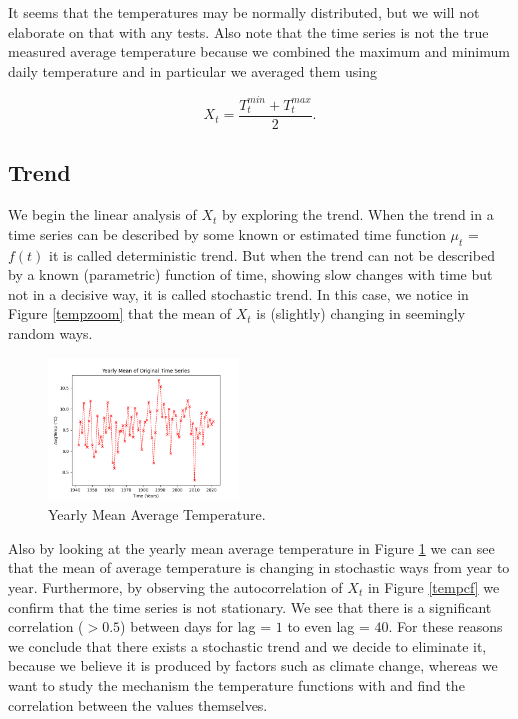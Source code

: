 \documentclass[conference]{IEEEtran}
\begin{document}
It seems that the temperatures may be normally distributed, but we will not elaborate on that with any tests. Also note that the time series is not the true measured average temperature because we combined the maximum and minimum daily temperature and in particular we averaged them using

\begin{equation}\label{avgeq}
    X_t = \frac{T^{min}_t+T^{max}_t}{2}.
\end{equation}

\subsection{Trend}

We begin the linear analysis of $X_t$ by exploring the trend. When the trend in a time series can be described by some known or estimated time function $\mu_t$ = $f(t)$ it is called deterministic trend. But when the trend can not be described by a known (parametric) function of time, showing slow changes with time but not in a decisive way, it is called stochastic trend. In this case, we notice in Figure \ref{tempzoom} that the mean of $X_t$ is (slightly) changing in seemingly random ways. 

\begin{figure}[ht]
    \centering
    \includegraphics[width=0.45\textwidth]{Figures/Yearly Mean of Original Time Series.png}
    \caption{Yearly Mean Average Temperature.}
    \label{tempym}
\end{figure}

Also by looking at the yearly mean average temperature in Figure \ref{tempym} we can see that the mean of average temperature is changing in stochastic ways from year to year. Furthermore, by observing the autocorrelation of $X_t$ in Figure \ref{tempcf} we confirm that the time series is not stationary. We see that there is a significant correlation ($> 0.5$) between days for lag = $1$ to even lag = $40$. For these reasons we conclude that there exists a stochastic trend and we decide to eliminate it, because we believe it is produced by factors such as climate change, whereas we want to study the mechanism the temperature functions with and find the correlation between the values themselves. 
\end{document}
